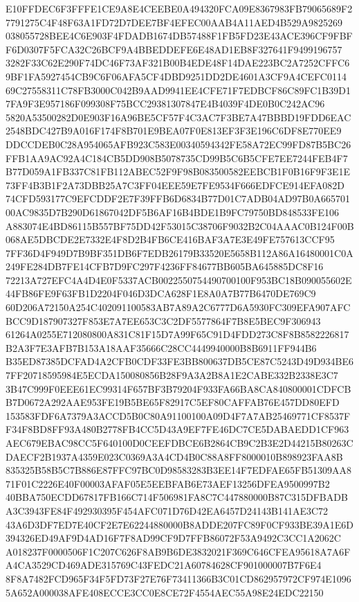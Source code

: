 \documentclass[UTF8,fontset=fandol,zihao=-4,a4paper]{ctexart}
\begin{document}
{{E10FFDEC6F3FFFE1CE9A8E4CEEBE0A494320FCA09E8367983FB79065689F27791275C4F48F63A1FD72D7DEE7BF4EFEC00AAB4A11AED4B529A9825269
038055728BEE4C6E903F4FDADB1674DB57488F1FB5FD23E43ACE396CF9FBFF6D0307F5FCA32C26BCF9A4BBEDDEFE6E48AD1EB8F327641F9499196757
3282F33C62E290F74DC46F73AF321B00B4EDE48F14DAE223BC2A7252CFFC69BF1FA5927454CB9C6F06AFA5CF4DBD9251DD2DE4601A3CF9A4CEFC0114
69C27558311C78FB3000C042B9AAD9941EE4CFE71F7EDBCF86C89FC1B39D17FA9F3E957186F099308F75BCC29381307847E4B4039F4DE0B0C242AC96
5820A53500282D0E903F16A96BE5CF57F4C3AC7F3BE7A47BBBD19FDD6EAC2548BDC427B9A016F174F8B701E9BEA07F0E813EF3F3E196C6DF8E770EE9
DDCCDEB0C28A954065AFB923C583E00340594342FE58A72EC99FD87B5BC26FFB1AA9AC92A4C184CB5DD908B5078735CD99B5C6B5CFE7EE7244FEB4F7
B77D059A1FB337C81FB112ABEC52F9F98B083500582EEBCB1F0B16F9F3E1E73FF4B3B1F2A73DBB25A7C3FF04EEE59E7FE9534F666EDFCE914EFA082D
74CFD593177C9EFCDDF2E7F39FFB6D6834B77D01C7ADB04AD97B0A66570100AC9835D7B290D61867042DF5B6AF16B4BDE1B9FC79750BD848533FE106
A883074E4BD86115B557BF75DD42F53015C38706F9032B2C04AAAC0B124F00B068AE5DBCDE2E7332E4F8D2B4FB6CE416BAF3A7E3E49FE757613CCF95
7FF36D4F949D7B9BF351DB6F7EDB26179B33520E5658B112A86A16480001C0A249FE284DB7FE14CFB7D9FC297F4236FF84677BB605BA645885DC8F16
72213A727EFC4A4D4E0F5337ACB0022550754490700100F953BC18B090055602E44FB86FE9F63FB1D2204F046D3DCA628F1E8A0A7B77B6470DE769C9
60D206A72150A254C402091100583AB7A89A2C6777D6A5930FC309EFA907AFCBCC9D187907327F853E7A7EE653C3C2DF5577864F7B8E5BEC9F306943
61264A0255E712080800A831C81F15D7A99F65C91D4FDD273C8F8B8582226817B2A3F7E3AFB7B153A18AAF35666C28CC4449940000B8B6911FF944B6
B35ED87385DCFAD4A2CFB0CDF33FE3BB800637DB5CE87C5243D49D934BE67FF20718595984E5ECDA150080856B28F9A3A2B8A1E2CABE332B2338E3C7
3B47C999F0EEE61EC99314F657BF3B79204F933FA66BA8CA840800001CDFCBB7D0672A292AAE953FE19B5BE65F82917C5EF80CAFFAB76E457DD80EFD
153583FDF6A7379A3ACCD5B0C80A91100100A09D4F7A7AB25469771CF8537FF34F8BD8FF93A480B2778FB4CC5D43A9EF7FE46DC7CE5DABAEDD1CF963
AEC679EBAC98CC5F640100D0CEEFDBCE6B2864CB9C2B3E2D44215B80263CDAECF2B1937A4359E023C0369A3A4CD4B0C88A8FF8000010B898923FAA8B
835325B58B5C7B886E87FFC97BC0D98583283B3EE14F7EDFAE65FB51309AA871F01C2226E40F00003AFAF05E5EEBFAB6E73AEF13256DFEA9500997B2
40BBA750ECDD67817FB166C714F506981FA8C7C447880000B87C315DFBADBA3C3943FE84F492930395F454AFC071D76D42EA6457D24143B141AE3C72
43A6D3DF7ED7E40CF2E7E62244880000B8ADDE207FC89F0CF933BE39A1E6D394326ED49AF9D4AD16F7F8AD99CF9D7FFB86072F53A9492C3CC1A2062C
A018237F0000506F1C207C626F8AB9B6DE3832021F369C646CFEA95618A7A6FA4CA3529CD469ADE315769C43FEDC21A60784628CF901000007B7F6E4
8F8A7482FCD965F34F5FD73F27E76F73411366B3C01CD862957972CF974E10965A652A000038AFE408ECCE3CC0E8CE72F4554AEC55A98E24EDC22150
}}
\end{document}
